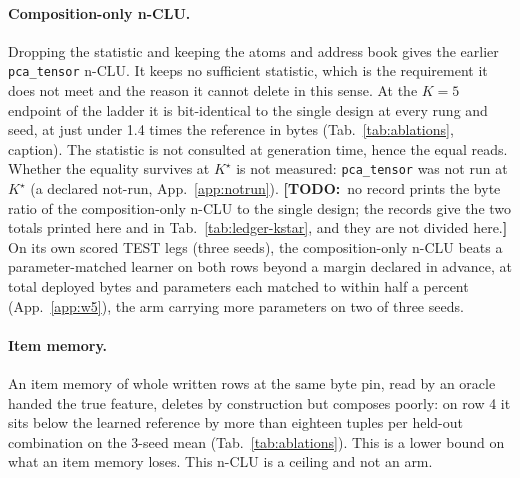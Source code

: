 \documentclass{article} %
\newcommand{\TODO}[1]{{\color{orange}\textbf{[TODO:}~#1\textbf{]}}}
\newcommand{\Kstar}{\ensuremath{K^{\star}}}
\begin{document}
\paragraph{Composition-only n-CLU.} Dropping the statistic and keeping the atoms and address book gives the earlier \texttt{pca\_tensor} n-CLU. It keeps no
sufficient statistic, which is the requirement it does not meet and the reason it cannot delete in this sense. At the $K=5$ endpoint of the ladder it is bit-identical to the single design at every rung and seed, at just under 1.4 times the reference in bytes (Tab.~\ref{tab:ablations}, caption).
The statistic is not consulted at generation time, hence the equal reads. Whether the
equality survives at $\Kstar$ is not measured: \texttt{pca\_tensor} was not run at
$\Kstar$ (a declared not-run, App.~\ref{app:notrun}). \TODO{no record prints the byte ratio of the composition-only n-CLU to the single design;
the records give the two totals printed here and in Tab.~\ref{tab:ledger-kstar}, and they are
not divided here.}
On its own scored TEST legs (three seeds), the composition-only n-CLU beats a parameter-matched
learner on both rows beyond a margin declared in advance, at total deployed bytes and parameters each matched to within half a percent (App.~\ref{app:w5}), the arm carrying more parameters on two of three seeds.

\paragraph{Item memory.} An item memory of whole written rows at
the same byte pin, read by an oracle handed the true feature, deletes by construction but
composes poorly: on row 4 it sits below the learned
reference by more than eighteen tuples per held-out combination on the 3-seed mean (Tab.~\ref{tab:ablations}). This is a lower bound on what an item memory
loses. This n-CLU is a ceiling and not an arm. %
\end{document}
